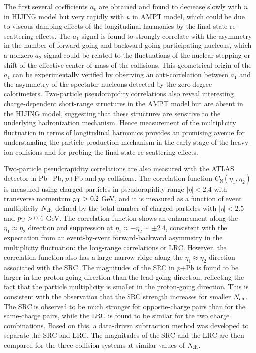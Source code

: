 The first several coefficients $a_n$ are obtained and found to decrease slowly with $n$ in HIJING model but very rapidly with $n$ in AMPT model, which could be due to viscous damping effects of the longitudinal harmonics by the final-state re-scattering effects. The $a_1$ signal is found to strongly correlate with the asymmetry in the number of forward-going and backward-going participating nucleons, which a nonzero $a_2$ signal could be related to the fluctuations of the nuclear stopping or shift of the effective center-of-mass of the collisions. This geometrical origin of the $a_1$ can be experimentally verified by observing an anti-correlation between $a_1$ and the asymmetry of the spectator nucleons detected by the zero-degree calorimeters. Two-particle pseudorapidity correlations also reveal interesting charge-dependent short-range structures in the AMPT model but are absent in the HIJING model, suggesting that these structures are sensitive to the underlying hadronization mechanism. Hence measurement of the multiplicity fluctuation in terms of longitudinal harmonics provides an promising avenue for understanding the particle production mechanism in the early stage of the heavy-ion collisions and for probing the final-state re-scattering effects.

Two-particle pseudorapidity correlations are also measured with the ATLAS detector in Pb+Pb, $p$+Pb and $pp$ collisions. The correlation function $C_\text{N}(\eta_1, \eta_2)$ is measured using charged particles in pseudorapidity range $|\eta|<2.4$ with transverse momentum $p_\text{T}>0.2$ GeV, and it is measured as a function of event multiplicity $N_\text{ch}$ defined by the total number of charged particles with $|\eta|<2.5$ and $p_\text{T}>0.4$ GeV. The correlation function shows an enhancement along the $\eta_1 \approx \eta_2$ direction and suppression at $\eta_1 \approx -\eta_2 \sim \pm 2.4$, consistent with the expectation from an event-by-event forward-backward asymmetry in the multiplicity fluctuation: the long-range correlations or LRC. However, the correlation function also has a large narrow ridge along the $\eta_1 \approx \eta_2$ direction associated with the SRC. The magnitudes of the SRC in $p$+Pb is found to be larger in the proton-going direction than the lead-going direction, reflecting the fact that the particle multiplicity is smaller in the proton-going direction. This is consistent with the observation that the SRC strength increases for smaller $N_\text{ch}$. The SRC is observed to be much stronger for opposite-charge pairs than for the same-charge pairs, while the LRC is found to be similar for the two charge combinations. Based on this, a data-driven subtraction method was developed to separate the SRC and LRC. The magnitudes of the SRC and the LRC are then compared for the three collision systems at similar values of $N_\text{ch}$.

